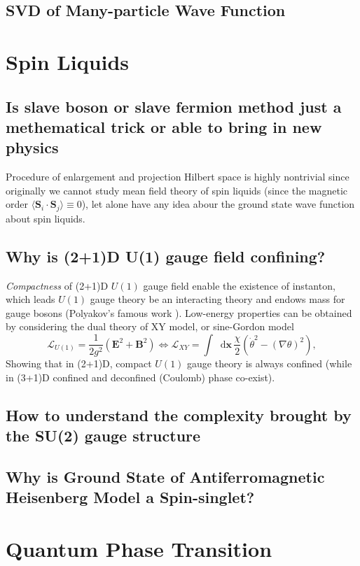 \documentclass[10pt,nofootinbib]{revtex4}
\newcommand*\dd{\mathop{}\!\mathrm{d}}
\begin{document}
	\subsection{SVD of Many-particle Wave Function}

\section{Spin Liquids}
	\subsection{Is slave boson or slave fermion method just a methematical trick or able to bring in new physics}
		Procedure of enlargement and projection Hilbert space is highly nontrivial since originally we cannot study mean field theory of spin liquids (since the magnetic order $\langle \bm{S}_i\cdot\bm{S}_j\rangle\equiv0$), let alone have any idea abour the ground state wave function about spin liquids. 
	\subsection{Why is (2+1)D U(1) gauge field confining?}
		\emph{Compactness} of (2+1)D $U(1)$ gauge field	enable the existence of instanton, which leads $U(1)$ gauge theory be an interacting theory and endows mass for gauge bosons (Polyakov's famous work \cite{polyakov1977quark}). Low-energy properties can be obtained by considering the dual theory of XY model, or sine-Gordon model \cite{kogut1979introduction,wen2004quantum}
		\begin{equation*}
			\mathcal{L}_{U(1)}=\dfrac{1}{2g^2}(\bm{E}^2+\bm{B}^2)\Longleftrightarrow\mathcal{L}_{XY}=\int\dd\bm{x}\,\frac{\chi}{2}\left(\dot{\theta}^2-(\nabla\theta)^2\right),
		\end{equation*}
		Showing that in (2+1)D, compact $U(1)$ gauge theory is always confined (while in (3+1)D confined and deconfined (Coulomb) phase co-exist).
	\subsection{How to understand the complexity brought by the SU(2) gauge structure}

	\subsection{Why is Ground State of Antiferromagnetic Heisenberg Model a Spin-singlet?}

\section{Quantum Phase Transition}
\end{document}

